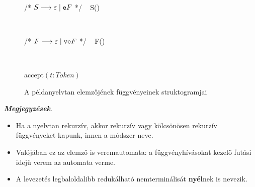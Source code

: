 \begin{figure}[h!]
	\centering
	
	~\\
	
\begin{stuki*}{/* $S \longrightarrow \varepsilon \mid \texttt{e}F$ */ ~ S()}
	\begin{CASE}{3}{3}
	\end{CASE}
\end{stuki*}

~\\

\begin{stuki*}{/* $F \longrightarrow \varepsilon \mid \texttt{ve}F$ */ ~ F()}
	\begin{CASE}{4}{3}
	\end{CASE}
\end{stuki*}

~\\

\begin{stuki*}{accept$(t : Token)$}
	\begin{IF}{1}{}
		\ELSE
	\end{IF}
\end{stuki*}
	\caption{A példanyelvtan elemzőjének függvényeinek struktogramjai}
\end{figure}

\newpage

\textbf{\textit{Megjegyzések}}.
\begin{itemize}
	\item Ha a nyelvtan rekurzív, akkor rekurzív vagy kölcsönösen rekurzív függvényeket kapunk, innen a módszer neve.
	
	\item Valójában ez az elemző is veremautomata: a függvényhívásokat kezelő futási idejű verem az automata verme.
	
	\item A levezetés legbaloldalibb redukálható nemterminálisát \textbf{nyél}nek is nevezik.
\end{itemize}

